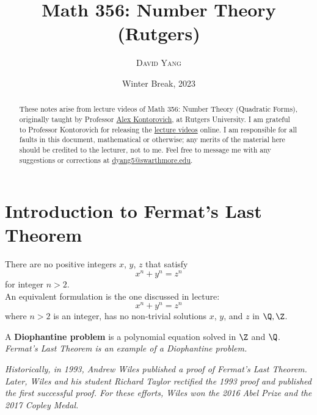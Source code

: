\documentclass[11pt]{article}
\begin{document}
\title{\LARGE \textbf{Math 356: Number Theory (Rutgers)}}
\date{Winter Break, 2023}
\author{\textsc{David Yang}}

\maketitle

\begin{abstract}
These notes arise from lecture videos of Math 356: Number Theory (Quadratic Forms), originally taught by 
Professor \href{https://sites.math.rutgers.edu/~alexk/}{Alex Kontorovich}, at Rutgers University. I am grateful
to Professor Kontorovich for releasing the \href{https://www.youtube.com/playlist?list=PLs6rMe3K87LEwc77iVba5AsAUPC1qVowy}{lecture videos} online. 
I am responsible for all faults in this document, mathematical or otherwise; any merits of the
material here should be credited to the lecturer, not to me.
Feel free to message me with any suggestions or corrections at \href{mailto:dyang5@swarthmore.edu}{dyang5@swarthmore.edu}.
\end{abstract}

\tableofcontents

\newpage

\section{Introduction to Fermat's Last Theorem}

\begin{theorem}
There are no positive integers $x$, $y$, $z$ that satisfy \[x^n + y^n = z^n\]
for integer $n > 2$. \\

An equivalent formulation is the one discussed in lecture:
\[
    x^n + y^n = z^n
\] where $n > 2$ is an integer, has no non-trivial solutions $x$, $y$, and $z$ in $\Q, \Z$.
\end{theorem}

\begin{definition}
A \textbf{Diophantine problem} is a polynomial equation solved in $\Z$ and $\Q$. \\

\textit{Fermat's Last Theorem is an example of a Diophantine problem.}
\end{definition}

\textit{Historically, in 1993, Andrew Wiles published a proof of Fermat's Last Theorem. Later, Wiles and his student Richard Taylor rectified the 1993 proof and published
the first successful proof. For these efforts, Wiles won the 2016 Abel Prize and
the 2017 Copley Medal.} \\
\end{document}
